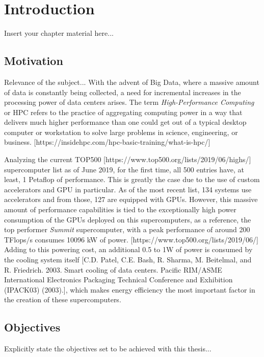 
\chapter{Introduction}
\label{chapter:introduction}

Insert your chapter material here...

\section{Motivation}
\label{section:motivation}

Relevance of the subject...
With the advent of Big Data, where a massive amount of data is constantly being collected, a need for incremental increases in the processing power of data centers arises. The term \textit{High-Performance Computing} or HPC refers to the practice of aggregating computing power in a way that delivers much higher performance than one could get out of a typical desktop computer or workstation to solve large problems in science, engineering, or business. [https://insidehpc.com/hpc-basic-training/what-is-hpc/] 

Analyzing the current TOP500 [https://www.top500.org/lists/2019/06/highs/]  supercomputer list as of June 2019, for the first time, all 500 entries have, at least, 1 Petaflop of performance. This is greatly the case due to the use of custom accelerators and GPU in particular. As of the most recent list, 134 systems use accelerators and from those, 127 are equipped with GPUs. However, this massive amount of performance capabilities is tied to the exceptionally high power consumption of the GPUs deployed on this supercomputers, as a reference, the top performer \textit{Summit} supercomputer, with a peak performance of around 200 TFlops/s consumes 10096 kW of power. [https://www.top500.org/lists/2019/06/] Adding to this powering cost, an additional 0.5 to 1W of power is consumed by the cooling system itself [C.D. Patel, C.E. Bash, R. Sharma, M. Beitelmal, and R. Friedrich. 2003. Smart cooling of data centers. Pacific RIM/ASME International Electronics Packaging Technical Conference and Exhibition (IPACK03) (2003).], which makes energy efficiency the most important factor in the creation of these supercomputers.
\section{Objectives}
\label{section:objectives}

Explicitly state the objectives set to be achieved with this thesis...
